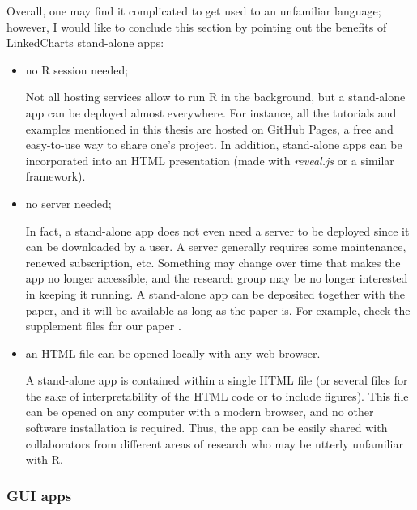 \documentclass[twocolumn,10pt]{article}
\begin{document}
Overall, one may find it complicated to get used to an unfamiliar language; however, I would like to conclude this section by pointing out the benefits of LinkedCharts stand-alone apps:

\begin{itemize}
   \item no R session needed;

   Not all hosting services allow to run R in the background, but a stand-alone app can be deployed almost everywhere. For instance, all the tutorials and examples mentioned in this thesis are hosted on GitHub Pages, a free and easy-to-use way to share one's project. In addition, stand-alone apps can be incorporated into an HTML presentation (made with \emph{reveal.js} or a similar framework).

   \item no server needed;

   In fact, a stand-alone app does not even need a server to be deployed since it can be downloaded by a user. A server generally requires some maintenance, renewed subscription, etc. Something may change over time that makes the app no longer accessible, and the research group may be no longer interested in keeping it running. A stand-alone app can be deposited together with the paper, and it will be available as long as the paper is. For example, check the supplement files for our paper \citep{ovchinnikova_2020}.

   \item an HTML file can be opened locally with any web browser.

   A stand-alone app is contained within a single HTML file (or several files for the sake of interpretability of the HTML code or to include figures). This file can be opened on any computer with a modern browser, and no other software installation is required. Thus, the app can be easily shared with collaborators from different areas of research who may be utterly unfamiliar with R.
\end{itemize}

\subsubsection{GUI apps}\label{gui_apps}
\end{document}
